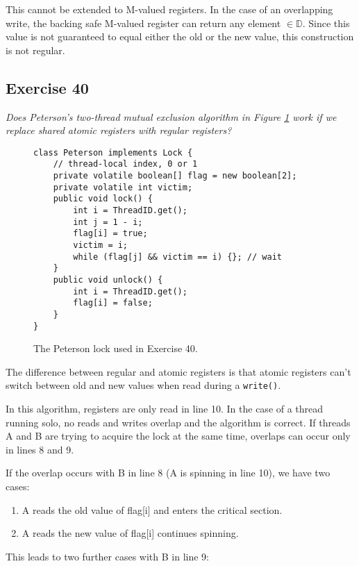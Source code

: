 \documentclass[a4paper,10pt]{article}
\begin{document}
This cannot be extended to M-valued registers. In the case of an overlapping write,
the backing safe M-valued register can return any element $\in \mathbb{D}$. Since this
value is not guaranteed to equal either the old or the new value, this construction is
not regular.


\subsection{Exercise 40}

\emph{Does Peterson’s two-thread mutual exclusion algorithm in Figure \ref{fig:peterson}
work if we replace shared atomic registers with regular registers?}

\vspace{3mm}

\begin{figure}
\begin{lstlisting}
class Peterson implements Lock {
    // thread-local index, 0 or 1
    private volatile boolean[] flag = new boolean[2];
    private volatile int victim;
    public void lock() {
        int i = ThreadID.get();
        int j = 1 - i;
        flag[i] = true;
        victim = i;
        while (flag[j] && victim == i) {}; // wait
    }
    public void unlock() {
        int i = ThreadID.get();
        flag[i] = false;
    }
}
\end{lstlisting}
\caption{The Peterson lock used in Exercise 40.}
\label{fig:peterson}
\end{figure}

The difference between regular and atomic registers is that atomic registers can't
switch between old and new values when read during a \lstinline|write()|.

In this algorithm, registers are only read in line 10. In the case of a thread running
solo, no reads and writes overlap and the algorithm is correct. If threads A and B
are trying to acquire the lock at the same time, overlaps can occur only in lines
8 and 9. 

If the overlap occurs with B in line 8 (A is spinning in line 10), we have two cases:

\begin{enumerate}
\item A reads the old value of flag[i] and enters the critical section.
\item A reads the new value of flag[i] continues spinning.
\end{enumerate}

This leads to two further cases with B in line 9:
\end{document}
